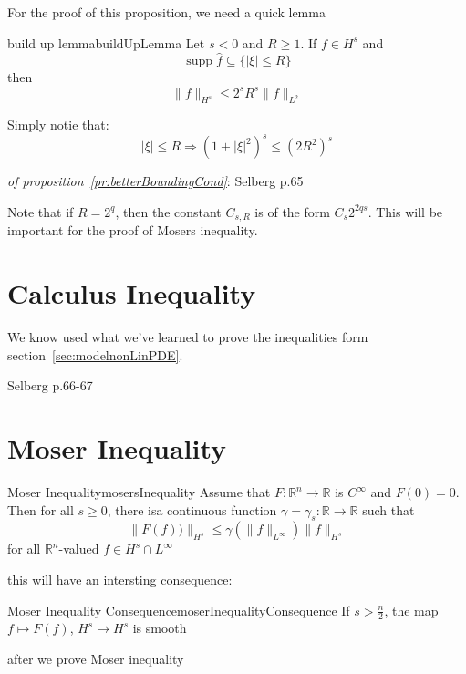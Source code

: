 \documentclass{book}
\newenvironment{Proof}[1][]
  {\begin{ProofTcb}[#1]}
  {\end{ProofTcb}}
\newcommand{\R}{{\mathbb{R}}}
\newcommand{\sse}{\subseteq}
\newcommand{\rw}{\rightarrow}
\newcommand{\Rw}{\Rightarrow}
\newcommand{\supp}{\operatorname{supp}}
\begin{document}
For the proof of this proposition, we need a quick lemma

\begin{lem}{build up lemma}{buildUpLemma}
	Let $s < 0$ and $R \ge 1$. If $f \in H^s$ and
	\[
		\supp \hat{f} \sse \{|\xi| \le R\}
	\]
	then
	\[
		\|f\|_{H^s} \le 2^sR^s\|f\|_{L^2}
	\]
\end{lem}

\begin{Proof}
	Simply notie that:
	\[
		|\xi| \le R \Rw (1+|\xi|^2)^s \le (2R^2)^s
	\]
\end{Proof}

\begin{Proof}
	\emph{of proposition~\ref{pr:betterBoundingCond}}: Selberg p.65
\end{Proof}

Note that if $R = 2^q$, then the constant $C_{s, R}$ is of the form $C_s2^{2qs}$. This will be important for
the proof of Mosers inequality.


\section{Calculus Inequality}

We know used what we've learned to prove the inequalities form section~\ref{sec:modelnonLinPDE}.


Selberg p.66-67


\section{Moser Inequality}

\begin{thm}{Moser Inequality}{mosersInequality}
	Assume that $F: \R^n \rw \R$ is $C^\infty$ and $F(0) = 0$. Then for all $s \ge 0$, there isa continuous
	function $\gamma = \gamma_s: \R \rw \R$ such that
	\[
		\|F(f))\|_{H^s} \le \gamma(\|f\|_{L^\infty})\|f\|_{H^s}
	\]
	for all $\R^n$-valued $f \in H^s \cap L^\infty$
\end{thm}

this will have an intersting consequence:

\begin{cor}{Moser Inequality Consequence}{moserInequalityConsequence}
	If $s > \frac{n}{2}$, the map $f \mapsto F(f)$, $H^s \rw H^s$ is smooth
\end{cor}

\begin{Proof}
	after we prove Moser inequality
\end{Proof}
\end{document}
